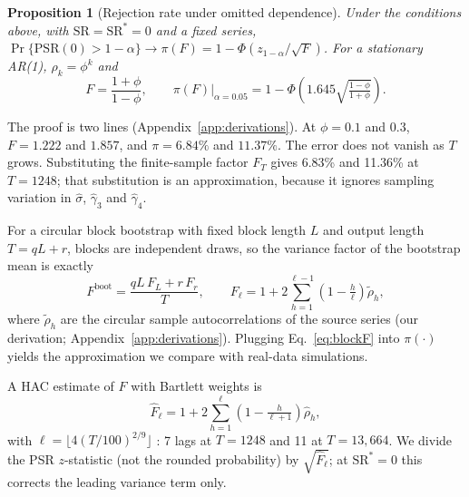 \documentclass[11pt,a4paper]{article}
\newcommand{\SR}{\mathrm{SR}}
\newtheorem{proposition}{Proposition}
\theoremstyle{remark}
\begin{document}
\begin{proposition}[Rejection rate under omitted dependence]\label{prop:rate}
Under the conditions above, with $\SR=\SR^\ast=0$ and a fixed series, $\Pr\{\mathrm{PSR}(0)>1-\alpha\}\to\pi(F)=1-\Phi\!\left(z_{1-\alpha}/\sqrt F\right)$. For a stationary AR(1), $\rho_k=\phi^k$ and
\begin{equation}\label{eq:ar1rate}
F=\frac{1+\phi}{1-\phi},\qquad \pi(F)\big|_{\alpha=0.05}=1-\Phi\!\left(1.645\sqrt{\tfrac{1-\phi}{1+\phi}}\right).
\end{equation}
\end{proposition}
\noindent The proof is two lines (Appendix~\ref{app:derivations}). At $\phi=0.1$ and $0.3$, $F=1.222$ and $1.857$, and $\pi=6.84\%$ and $11.37\%$. The error does not vanish as $T$ grows. Substituting the finite-sample factor $F_T$ gives 6.83\% and 11.36\% at $T=1248$; that substitution is an approximation, because it ignores sampling variation in $\hat\sigma$, $\hat\gamma_3$ and $\hat\gamma_4$.

For a circular block bootstrap with fixed block length $L$ and output length $T=qL+r$, blocks are independent draws, so the variance factor of the bootstrap mean is exactly
\begin{equation}\label{eq:blockF}
F^{\mathrm{boot}}=\frac{qL\,F_L+r\,F_r}{T},\qquad F_\ell=1+2\sum_{h=1}^{\ell-1}\left(1-\tfrac{h}{\ell}\right)\tilde\rho_h ,
\end{equation}
where $\tilde\rho_h$ are the circular sample autocorrelations of the source series (our derivation; Appendix~\ref{app:derivations}). Plugging Eq.~\eqref{eq:blockF} into $\pi(\cdot)$ yields the approximation we compare with real-data simulations.

A HAC estimate of $F$ with Bartlett weights \citep{newey1987} is
\begin{equation}\label{eq:nw}
\hat F_\ell=1+2\sum_{h=1}^{\ell}\left(1-\tfrac{h}{\ell+1}\right)\hat\rho_h ,
\end{equation}
with $\ell=\lfloor4(T/100)^{2/9}\rfloor$ \citep{newey1994}: 7 lags at $T=1248$ and 11 at $T=13{,}664$. We divide the PSR $z$-statistic (not the rounded probability) by $\sqrt{\hat F_\ell}$; at $\SR^\ast=0$ this corrects the leading variance term only.
\end{document}
